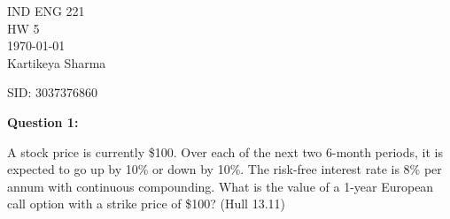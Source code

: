 \documentclass[12pt,letterpaper, onecolumn]{exam}
\begin{document}
\newenvironment{question}[1]{\noindent\textbf{#1}\par}{\par}
\begingroup  
    \centering
    \LARGE IND ENG 221\\
    \LARGE HW 5\\[0.5em]
    \large \today\\[0.5em]
    \large Kartikeya Sharma\par
    \large SID: 3037376860\par
\endgroup

\pointsdroppedatright   %
\printanswers
\renewcommand{\solutiontitle}{\noindent\textbf{Ans:}\enspace}   %

\begin{question}{Question 1:} A stock price is currently \$100. Over each of the next two 6-month periods, it is expected to go up by 10\% or down by 10\%. The risk-free interest rate is 8\% per annum with continuous compounding. What is the value of a 1-year European call option with a strike price of \$100? (Hull 13.11)
\end{question}
\end{document}
